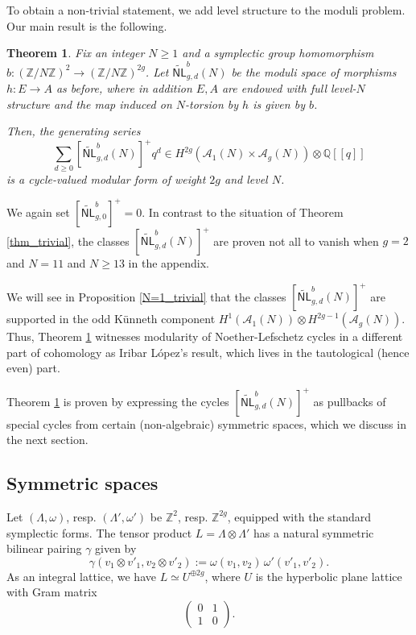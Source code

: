 \documentclass[12pt]{amsart}
\def\cA{\mathcal{A}}
\def\bQ{\mathbb{Q}}
\def\bZ{\mathbb{Z}}
\newcommand{\wNL}{{\widetilde{\mathsf{NL}}}}
\newtheorem{thm}{Theorem}[section]
\theoremstyle{definition}
\begin{document}
To obtain a non-trivial statement, we add level structure to the moduli problem. Our main result is the following.
\begin{thm}\label{thm_levelN}
Fix an integer $N\ge1$ and a symplectic group homomorphism $b:(\bZ/N\bZ)^2\to (\bZ/N\bZ)^{2g}$. Let $\wNL^b_{g,d}(N)$ be the moduli space of morphisms $h:E\to A$ as before, where in addition $E,A$ are endowed with full level-$N$ structure and the map induced on $N$-torsion by $h$ is given by $b$.

Then, the generating series
    \begin{equation*}
        \sum_{d\ge 0}[\wNL^b_{g,d}(N)]^+q^d \in  H^{2g}(\cA_1(N)\times \cA_g(N))\otimes \bQ[[q]]
    \end{equation*}
    is a cycle-valued modular form of weight $2g$ and level $N$.
\end{thm}

We again set $[\wNL^b_{g,0}]^+=0$. In contrast to the situation of Theorem \ref{thm_trivial}, the classes $[\wNL^b_{g,d}(N)]^+$ are proven not all to vanish when $g=2$ and $N=11$ and $N\ge13$ in the appendix.

We will see in Proposition \ref{N=1_trivial} that the classes $[\wNL^b_{g,d}(N)]^+$ are supported in the odd K\"{u}nneth component $H^1(\cA_1(N))\otimes H^{2g-1}(\cA_g(N))$. Thus, Theorem \ref{thm_levelN} witnesses modularity of Noether-Lefschetz cycles in a different part of cohomology as Iribar L\'{o}pez's result, which lives in the tautological (hence even) part.

Theorem \ref{thm_levelN} is proven by expressing the cycles $[\wNL^b_{g,d}(N)]^+$ as pullbacks of special cycles from certain (non-algebraic) symmetric spaces, which we discuss in the next section.

\subsection{Symmetric spaces}
Let $(\Lambda,\omega)$, resp. $(\Lambda',\omega')$ be $\bZ^2$, resp. $\bZ^{2g}$, equipped with the standard symplectic forms. The tensor product $L=\Lambda\otimes \Lambda'$ has a natural symmetric bilinear pairing $\gamma$ given by
\begin{equation*}
    \gamma(v_1\otimes v'_1, v_2\otimes v'_2):= \omega(v_1,v_2)\,\omega'(v'_1,v'_2). 
\end{equation*}
As an integral lattice, we have $L\simeq U^{\oplus 2g}$, where $U$ is the hyperbolic plane lattice with Gram matrix
\begin{equation*}
\begin{pmatrix}  0 & 1 \\ 1 & 0 \end{pmatrix}.
\end{equation*}
\end{document}
